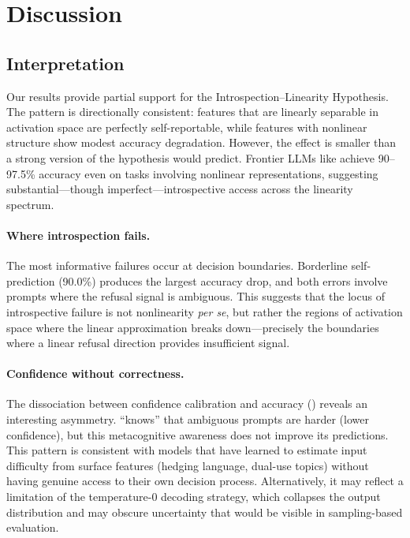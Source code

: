 \section{Discussion}
\label{sec:discussion}

\subsection{Interpretation}

Our results provide partial support for the Introspection--Linearity Hypothesis. The pattern is directionally consistent: features that are linearly separable in activation space are perfectly self-reportable, while features with nonlinear structure show modest accuracy degradation. However, the effect is smaller than a strong version of the hypothesis would predict. Frontier LLMs like \gptfour achieve 90--97.5\% accuracy even on tasks involving nonlinear representations, suggesting substantial---though imperfect---introspective access across the linearity spectrum.

\paragraph{Where introspection fails.}
The most informative failures occur at decision boundaries. Borderline self-prediction (90.0\%) produces the largest accuracy drop, and both errors involve prompts where the refusal signal is ambiguous. This suggests that the locus of introspective failure is not nonlinearity \emph{per se}, but rather the regions of activation space where the linear approximation breaks down---precisely the boundaries where a linear refusal direction provides insufficient signal.

\paragraph{Confidence without correctness.}
The dissociation between confidence calibration and accuracy () reveals an interesting asymmetry. \gptfour ``knows'' that ambiguous prompts are harder (lower confidence), but this metacognitive awareness does not improve its predictions. This pattern is consistent with models that have learned to estimate input difficulty from surface features (hedging language, dual-use topics) without having genuine access to their own decision process. Alternatively, it may reflect a limitation of the temperature-0 decoding strategy, which collapses the output distribution and may obscure uncertainty that would be visible in sampling-based evaluation.

